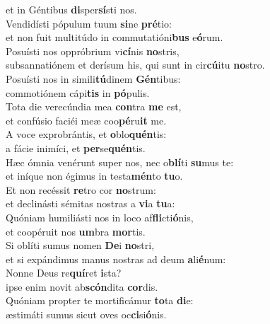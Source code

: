 \oddverse et in Géntibus \textbf{di}sper\textbf{sí}sti nos.\\
\evenverse Vendidísti pópulum tuum \textbf{si}ne \textbf{pré}tio:~\*\\
\evenverse et non fuit multitúdo in commutatióni\textbf{bus} e\textbf{ó}rum.\\
\oddverse Posuísti nos oppróbrium vi\textbf{cí}nis \textbf{no}stris,~\*\\
\oddverse subsannatiónem et derísum his, qui sunt in cir\textbf{cú}itu \textbf{no}stro.\\
\evenverse Posuísti nos in simili\textbf{tú}dinem \textbf{Gén}tibus:~\*\\
\evenverse commotiónem cápi\textbf{tis} in \textbf{pó}pulis.\\
\oddverse Tota die verecúndia mea \textbf{con}tra \textbf{me} est,~\*\\
\oddverse et confúsio faciéi meæ coo\textbf{pé}ru\textbf{it} me.\\
\evenverse A voce exprobrántis, et \textbf{o}blo\textbf{quén}tis:~\*\\
\evenverse a fácie inimíci, et \textbf{per}se\textbf{quén}tis.\\
\oddverse Hæc ómnia venérunt super nos, nec o\textbf{blí}ti \textbf{su}mus te:~\*\\
\oddverse et iníque non égimus in testa\textbf{mén}to \textbf{tu}o.\\
\evenverse Et non recéssit \textbf{re}tro cor \textbf{no}strum:~\*\\
\evenverse et declinásti sémitas nostras a \textbf{vi}a \textbf{tu}a:\\
\oddverse Quóniam humiliásti nos in loco af\textbf{fli}cti\textbf{ó}nis,~\*\\
\oddverse et coopéruit nos \textbf{um}bra \textbf{mor}tis.\\
\evenverse Si oblíti sumus nomen \textbf{De}i \textbf{no}stri,~\*\\
\evenverse et si expándimus manus nostras ad deum \textbf{a}li\textbf{é}num:\\
\oddverse Nonne Deus re\textbf{quí}ret \textbf{i}sta?~\*\\
\oddverse ipse enim novit ab\textbf{scón}dita \textbf{cor}dis.\\
\evenverse Quóniam propter te mortificámur \textbf{to}ta \textbf{di}e:~\*\\
\evenverse æstimáti sumus sicut oves oc\textbf{ci}si\textbf{ó}nis.\\
